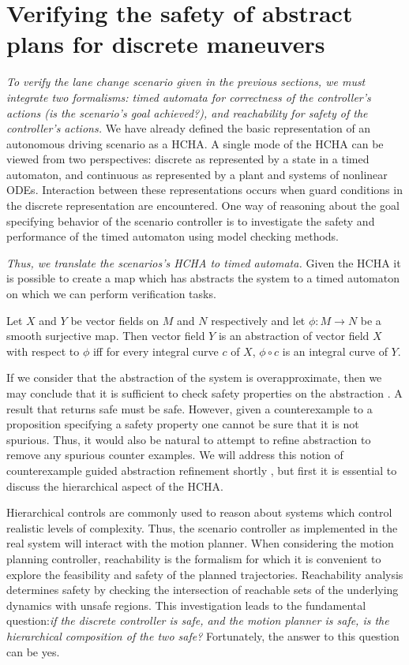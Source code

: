 \section{Verifying the safety of abstract plans for discrete maneuvers}
\label{verifyingSafety}

{\it To verify the lane change scenario given in the previous sections, we must integrate two formalisms: timed automata for correctness of the controller's actions (is the scenario's goal achieved?), and reachability for safety of the controller's actions.} 
We have already defined the basic representation of an autonomous driving scenario as a HCHA. 
A single mode of the HCHA can be viewed from two perspectives: discrete as represented by a state in a timed automaton, and continuous as represented by a plant and systems of nonlinear ODEs. 
Interaction between these representations occurs when guard conditions in the discrete representation are encountered. 
One way of reasoning about the goal specifying behavior of the scenario controller is to investigate the safety and performance of the timed automaton using model checking methods.

{\it Thus, we translate the scenarios's HCHA to timed automata.} 
Given the HCHA it is possible to create a map which has abstracts the system to a timed automaton on which we can perform verification tasks. 
\begin{thm}
	Let \(X\) and \(Y\) be vector fields on \(M\) and \(N\) respectively and let \(\phi: M \rightarrow N\) be a smooth surjective map. Then vector field \(Y\) is an abstraction of vector field \(X\) with respect to \(\phi\) iff for every integral curve \(c\) of \(X\), \(\phi \circ c\) is an integral curve of \(Y\). \cite{Pappas1998} 
\end{thm}
If we consider that the abstraction of the system is overapproximate, then we may conclude that it is sufficient to check safety properties on the abstraction \cite{Pappas1998}. A result that returns safe must be safe. However, given a counterexample to a proposition specifying a safety property one cannot be sure that it is not spurious. Thus, it would also be natural to attempt to refine abstraction to remove any spurious counter examples. We will address this notion of counterexample guided abstraction refinement shortly \cite{Clarke2003}, but first it is essential to discuss the hierarchical aspect of the HCHA.

Hierarchical controls are commonly used to reason about systems which control realistic levels of complexity. Thus, the scenario controller as implemented in the real system will interact with the motion planner. When considering the motion planning controller, reachability is the formalism for which it is convenient to explore the feasibility and safety of the planned trajectories. Reachability analysis determines safety by checking the intersection of reachable sets of the underlying dynamics with unsafe regions. This investigation leads to the fundamental question:{\it if the discrete controller is safe, and the motion planner is safe, is the hierarchical composition of the two safe?} Fortunately, the answer to this question can be yes. 

